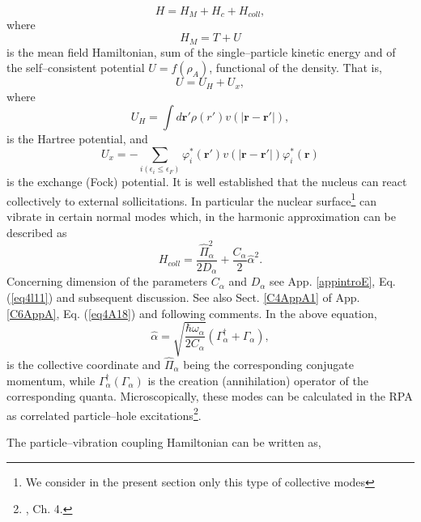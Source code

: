 \begin{equation}\label{eqn:30}
H = H_M + H_{c} + H_{coll} ,
\end{equation}
where
\begin{equation}
H_M=T+U
\end{equation}
is the mean field Hamiltonian, sum of the single--particle kinetic energy and of the self--consistent potential $U=f(\rho_A)$, functional of the  density. That is,
\begin{equation}
U=U_H+U_x,
\end{equation}
where
\begin{equation}
U_H=\int d\mathbf r'\rho(r')v(|\mathbf r- \mathbf r'|),
\end{equation}
is the Hartree potential, and
\begin{equation}
U_x=-\sum_{i(\epsilon_i\leq\epsilon_F)}\varphi_i^*(\mathbf r')v(|\mathbf r- \mathbf r'|)\varphi_i^*(\mathbf r)
\end{equation}
is the exchange (Fock) potential. It is well established that the nucleus can react collectively to external sollicitations. In particular the nuclear surface\footnote{We consider in the present section only this type of collective modes} can vibrate in certain normal modes which, in the harmonic approximation can be described as
 \begin{equation}
H_{coll}=\frac{\hat\Pi_\alpha^2}{2D_\alpha}+\frac{C_\alpha}{2}\hat\alpha^2.
 \end{equation}
 Concerning dimension of the parameters $C_\alpha$ and $D_\alpha$ see App. \ref{appintroE}, Eq. (\ref{eq4l11}) and subsequent discussion. See also Sect. \ref{C4AppA1} of App. \ref{C6AppA}, Eq. (\ref{eq4A18}) and following comments. In the above equation,  
 \begin{equation}
\hat\alpha=\sqrt{\frac{\hbar \omega_\alpha}{2C_\alpha}}\left(\Gamma^\dagger_\alpha+\Gamma_\alpha\right),
 \end{equation}
 is the collective coordinate and $\hat\Pi_\alpha$ being the corresponding conjugate momentum, while $\Gamma^\dagger_\alpha(\Gamma_\alpha)$ is the creation (annihilation) operator of the corresponding quanta. Microscopically, these modes can be calculated in the RPA as correlated particle--hole excitations\footnote{\cite{Bohm:51,Bohm:52,Bohm:53,Bertsch:05}, Ch. 4.}.
 
 
 
The particle--vibration coupling Hamiltonian can be written as,

